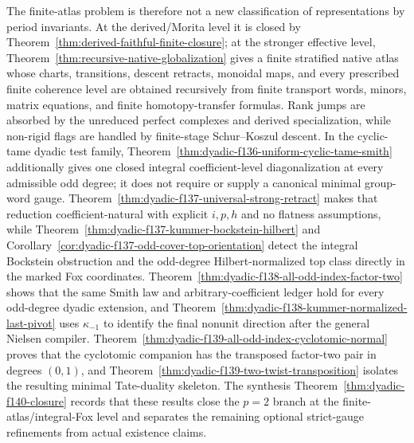 \documentclass[11pt]{article}
\theoremstyle{definition}
\begin{document}
The finite-atlas problem is therefore not a new classification of representations by period invariants.  At the derived/Morita level it is closed by Theorem~\ref{thm:derived-faithful-finite-closure}; at the stronger effective level, Theorem~\ref{thm:recursive-native-globalization} gives a finite stratified native atlas whose charts, transitions, descent retracts, monoidal maps, and every prescribed finite coherence level are obtained recursively from finite transport words, minors, matrix equations, and finite homotopy-transfer formulas.  Rank jumps are absorbed by the unreduced perfect complexes and derived specialization, while non-rigid flags are handled by finite-stage Schur--Koszul descent.  In the cyclic-tame dyadic test family, Theorem~\ref{thm:dyadic-f136-uniform-cyclic-tame-smith} additionally gives one closed integral coefficient-level diagonalization at every admissible odd degree; it does not require or supply a canonical minimal group-word gauge.  Theorem~\ref{thm:dyadic-f137-universal-strong-retract} makes that reduction coefficient-natural with explicit $i,p,h$ and no flatness assumptions, while Theorem~\ref{thm:dyadic-f137-kummer-bockstein-hilbert} and Corollary~\ref{cor:dyadic-f137-odd-cover-top-orientation} detect the integral Bockstein obstruction and the odd-degree Hilbert-normalized top class directly in the marked Fox coordinates.  Theorem~\ref{thm:dyadic-f138-all-odd-index-factor-two} shows that the same Smith law and arbitrary-coefficient ledger hold for every odd-degree dyadic extension, and Theorem~\ref{thm:dyadic-f138-kummer-normalized-last-pivot} uses $\kappa_{-1}$ to identify the final nonunit direction after the general Nielsen compiler.  Theorem~\ref{thm:dyadic-f139-all-odd-index-cyclotomic-normal} proves that the cyclotomic companion has the transposed factor-two pair in degrees $(0,1)$, and Theorem~\ref{thm:dyadic-f139-two-twist-transposition} isolates the resulting minimal Tate-duality skeleton.  The synthesis Theorem~\ref{thm:dyadic-f140-closure} records that these results close the $p=2$ branch at the finite-atlas/integral-Fox level and separates the remaining optional strict-gauge refinements from actual existence claims.
\end{document}
